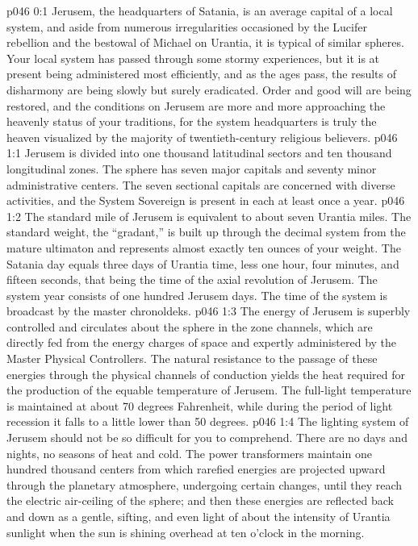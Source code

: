 \author{Archangel}
\vs p046 0:1 Jerusem, the headquarters of Satania, is an average capital of a local system, and aside from numerous irregularities occasioned by the Lucifer rebellion and the bestowal of Michael on Urantia, it is typical of similar spheres. Your local system has passed through some stormy experiences, but it is at present being administered most efficiently, and as the ages pass, the results of disharmony are being slowly but surely eradicated. Order and good will are being restored, and the conditions on Jerusem are more and more approaching the heavenly status of your traditions, for the system headquarters is truly the heaven visualized by the majority of twentieth\hyp{}century religious believers.
\vs p046 1:1 Jerusem is divided into one thousand latitudinal sectors and ten thousand longitudinal zones. The sphere has seven major capitals and seventy minor administrative centers. The seven sectional capitals are concerned with diverse activities, and the System Sovereign is present in each at least once a year.
\pc \vs p046 1:2 The standard mile of Jerusem is equivalent to about seven Urantia miles. The standard weight, the “gradant,” is built up through the decimal system from the mature ultimaton and represents almost exactly ten ounces of your weight. The Satania day equals three days of Urantia time, less one hour, four minutes, and fifteen seconds, that being the time of the axial revolution of Jerusem. The system year consists of one hundred Jerusem days. The time of the system is broadcast by the master chronoldeks.
\pc \vs p046 1:3 The energy of Jerusem is superbly controlled and circulates about the sphere in the zone channels, which are directly fed from the energy charges of space and expertly administered by the Master Physical Controllers. The natural resistance to the passage of these energies through the physical channels of conduction yields the heat required for the production of the equable temperature of Jerusem. The full\hyp{}light temperature is maintained at about 70 degrees Fahrenheit, while during the period of light recession it falls to a little lower than 50 degrees.
\pc \vs p046 1:4 The lighting system of Jerusem should not be so difficult for you to comprehend. There are no days and nights, no seasons of heat and cold. The power transformers maintain one hundred thousand centers from which rarefied energies are projected upward through the planetary atmosphere, undergoing certain changes, until they reach the electric air\hyp{}ceiling of the sphere; and then these energies are reflected back and down as a gentle, sifting, and even light of about the intensity of Urantia sunlight when the sun is shining overhead at ten o’clock in the morning.
